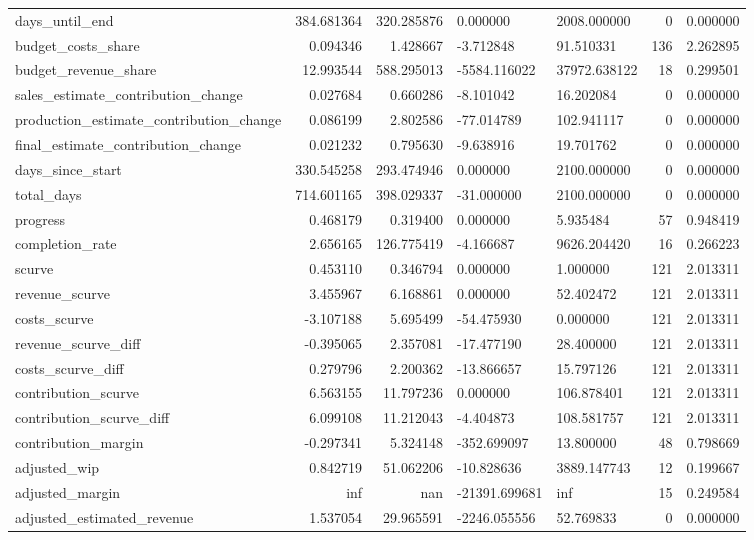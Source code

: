 \begin{landscape}
\begin{longtable}[h!]{lrrllrr}
days_until_end & 384.681364 & 320.285876 & 0.000000 & 2008.000000 & 0 & 0.000000 \\
budget_costs_share & 0.094346 & 1.428667 & -3.712848 & 91.510331 & 136 & 2.262895 \\
budget_revenue_share & 12.993544 & 588.295013 & -5584.116022 & 37972.638122 & 18 & 0.299501 \\
sales_estimate_contribution_change & 0.027684 & 0.660286 & -8.101042 & 16.202084 & 0 & 0.000000 \\
production_estimate_contribution_change & 0.086199 & 2.802586 & -77.014789 & 102.941117 & 0 & 0.000000 \\
final_estimate_contribution_change & 0.021232 & 0.795630 & -9.638916 & 19.701762 & 0 & 0.000000 \\
days_since_start & 330.545258 & 293.474946 & 0.000000 & 2100.000000 & 0 & 0.000000 \\
total_days & 714.601165 & 398.029337 & -31.000000 & 2100.000000 & 0 & 0.000000 \\
progress & 0.468179 & 0.319400 & 0.000000 & 5.935484 & 57 & 0.948419 \\
completion_rate & 2.656165 & 126.775419 & -4.166687 & 9626.204420 & 16 & 0.266223 \\
scurve & 0.453110 & 0.346794 & 0.000000 & 1.000000 & 121 & 2.013311 \\
revenue_scurve & 3.455967 & 6.168861 & 0.000000 & 52.402472 & 121 & 2.013311 \\
costs_scurve & -3.107188 & 5.695499 & -54.475930 & 0.000000 & 121 & 2.013311 \\
revenue_scurve_diff & -0.395065 & 2.357081 & -17.477190 & 28.400000 & 121 & 2.013311 \\
costs_scurve_diff & 0.279796 & 2.200362 & -13.866657 & 15.797126 & 121 & 2.013311 \\
contribution_scurve & 6.563155 & 11.797236 & 0.000000 & 106.878401 & 121 & 2.013311 \\
contribution_scurve_diff & 6.099108 & 11.212043 & -4.404873 & 108.581757 & 121 & 2.013311 \\
contribution_margin & -0.297341 & 5.324148 & -352.699097 & 13.800000 & 48 & 0.798669 \\
adjusted_wip & 0.842719 & 51.062206 & -10.828636 & 3889.147743 & 12 & 0.199667 \\
adjusted_margin & inf & nan & -21391.699681 & inf & 15 & 0.249584 \\
adjusted_estimated_revenue & 1.537054 & 29.965591 & -2246.055556 & 52.769833 & 0 & 0.000000 \\

\end{longtable}
\end{landscape}
